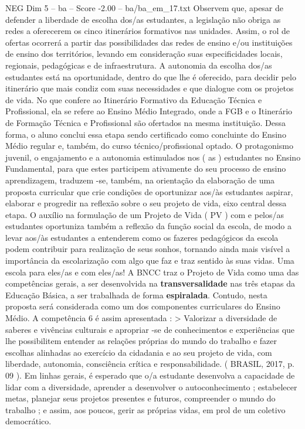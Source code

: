 \begin{textsample}{NEG Dim 5 – ba – Score -2.00 – ba/ba\_em\_17.txt}
Observem que, apesar de defender a liberdade de escolha dos/as estudantes, a legislação não obriga as redes a oferecerem os cinco itinerários formativos nas unidades.
Assim, o rol de ofertas ocorrerá a partir das possibilidades das redes de ensino e/ou instituições de ensino dos territórios, levando em consideração suas especificidades locais, regionais, pedagógicas e de infraestrutura.
A autonomia da escolha dos/as estudantes está na oportunidade, dentro do que lhe é oferecido, para decidir pelo itinerário que mais condiz com suas necessidades e que dialogue com os projetos de vida.
No que confere ao Itinerário Formativo da Educação Técnica e Profissional, ela se refere ao Ensino Médio Integrado, onde a FGB e o Itinerário de Formação Técnica e Profissional são ofertados na mesma instituição.
Dessa forma, o aluno conclui essa etapa sendo certificado como concluinte do Ensino Médio regular e, também, do curso técnico/profissional optado.
O protagonismo juvenil, o engajamento e a autonomia estimulados nos ( as ) estudantes no Ensino Fundamental, para que estes participem ativamente do seu processo de ensino aprendizagem, traduzem -se, também, na orientação da elaboração de uma proposta curricular que crie condições de oportunizar aos/às estudantes aspirar, elaborar e progredir na reflexão sobre o seu projeto de vida, eixo central dessa etapa.
O auxílio na formulação de um Projeto de Vida ( PV ) com e pelos/as estudantes oportuniza também a reflexão da função social da escola, de modo a levar aos/às estudantes a entenderem como os fazeres pedagógicos da escola podem contribuir para realização de seus sonhos, tornando ainda mais visível a importância da escolarização com algo que faz e traz sentido às suas vidas.
Uma escola para eles/as e com eles/as!
A BNCC traz o Projeto de Vida como uma das competências gerais, a ser desenvolvida na \textbf{transversalidade} nas três etapas da Educação Básica, a ser trabalhada de forma \textbf{espiralada}.
Contudo, nesta proposta será considerada como um dos componentes curriculares do Ensino Médio.
A competência 6 é assim apresentada : > Valorizar a diversidade de saberes e vivências culturais e apropriar -se de conhecimentos e experiências que lhe possibilitem entender as relações próprias do mundo do trabalho e fazer escolhas alinhadas ao exercício da cidadania e ao seu projeto de vida, com liberdade, autonomia, consciência crítica e responsabilidade. ( BRASIL, 2017, p. 09 ).
Em linhas gerais, é esperado que o/a estudante desenvolva a capacidade de lidar com a diversidade, aprender a desenvolver o autoconhecimento ; estabelecer metas, planejar seus projetos presentes e futuros, compreender o mundo do trabalho ; e assim, aos poucos, gerir as próprias vidas, em prol de um coletivo democrático.

\end{textsample}
